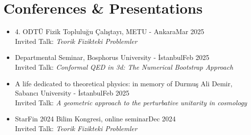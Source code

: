 \documentclass[a4paper,11pt]{article}
\begin{document}
\section{\textcolor{burntorange}{Conferences \& Presentations}}
\begin{itemize}[itemsep=.001em] 

\item[] 4. ODTÜ Fizik Topluluğu Çalıştayı, METU - Ankara\hfill Mar 2025
\\
\hspace*{1.8em}Invited Talk: \emph{Teorik Fizikteki Problemler}

\item[] Departmental Seminar, Bosphorus University - İstanbul\hfill Feb 2025
\\
\hspace*{1.8em}Invited Talk: \emph{Conformal QED in 3d: The Numerical Bootstrap Approach}

\item[] A life dedicated to theoretical physics: in memory of Durmuş Ali Demir, Sabancı University - İstanbul\hfill Feb 2025
\\
\hspace*{1.8em}Invited Talk: \emph{A geometric approach to the perturbative unitarity in cosmology}

\item[] StarFin 2024 Bilim Kongresi, online seminar\hfill Dec 2024
\\
\hspace*{1.8em}Invited Talk: \emph{Teorik Fizikteki Problemler}


\end{itemize}
\end{document}
